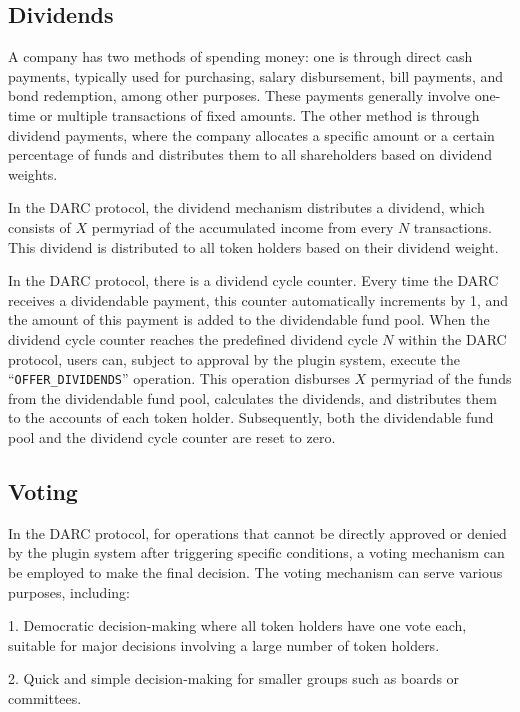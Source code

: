 \documentclass[main.tex]{subfiles}
\begin{document}
\subsection{Dividends}

A company has two methods of spending money: one is through direct cash payments, typically used for purchasing, salary disbursement, bill payments, and bond redemption, among other purposes. These payments generally involve one-time or multiple transactions of fixed amounts. The other method is through dividend payments, where the company allocates a specific amount or a certain percentage of funds and distributes them to all shareholders based on dividend weights.

In the DARC protocol, the dividend mechanism distributes a dividend, which consists of $X$ permyriad of the accumulated income from every $N$ transactions. This dividend is distributed to all token holders based on their dividend weight. 

In the DARC protocol, there is a dividend cycle counter. Every time the DARC receives a dividendable payment, this counter automatically increments by 1, and the amount of this payment is added to the dividendable fund pool. When the dividend cycle counter reaches the predefined dividend cycle $N$ within the DARC protocol, users can, subject to approval by the plugin system, execute the ``\texttt{OFFER\_DIVIDENDS}'' operation. This operation disburses $X$ permyriad of the funds from the dividendable fund pool, calculates the dividends, and distributes them to the accounts of each token holder. Subsequently, both the dividendable fund pool and the dividend cycle counter are reset to zero.



\subsection{Voting}

In the DARC protocol, for operations that cannot be directly approved or denied by the plugin system after triggering specific conditions, a voting mechanism can be employed to make the final decision. The voting mechanism can serve various purposes, including:

1. Democratic decision-making where all token holders have one vote each, suitable for major decisions involving a large number of token holders.

2. Quick and simple decision-making for smaller groups such as boards or committees.
\end{document}
